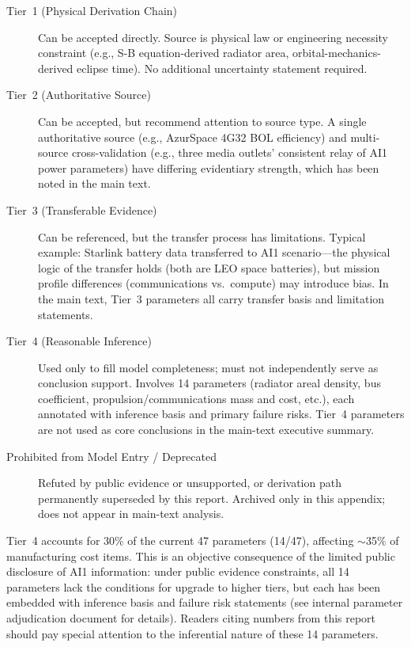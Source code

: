 \begin{description}
  \item[Tier~1 (Physical Derivation Chain)] Can be accepted directly. Source is physical law or engineering necessity constraint (e.g., S-B equation-derived radiator area, orbital-mechanics-derived eclipse time). No additional uncertainty statement required.

  \item[Tier~2 (Authoritative Source)] Can be accepted, but recommend attention to source type. A single authoritative source (e.g., AzurSpace 4G32 BOL efficiency) and multi-source cross-validation (e.g., three media outlets' consistent relay of AI1 power parameters) have differing evidentiary strength, which has been noted in the main text.

  \item[Tier~3 (Transferable Evidence)] Can be referenced, but the transfer process has limitations. Typical example: Starlink battery data transferred to AI1 scenario---the physical logic of the transfer holds (both are LEO space batteries), but mission profile differences (communications vs.\ compute) may introduce bias. In the main text, Tier~3 parameters all carry transfer basis and limitation statements.

  \item[Tier~4 (Reasonable Inference)] Used only to fill model completeness; must not independently serve as conclusion support. Involves 14 parameters (radiator areal density, bus coefficient, propulsion/communications mass and cost, etc.), each annotated with inference basis and primary failure risks. Tier~4 parameters are not used as core conclusions in the main-text executive summary.

  \item[Prohibited from Model Entry / Deprecated] Refuted by public evidence or unsupported, or derivation path permanently superseded by this report. Archived only in this appendix; does not appear in main-text analysis.
\end{description}

Tier~4 accounts for 30\% of the current 47 parameters (14/47), affecting $\sim$35\% of manufacturing cost items. This is an objective consequence of the limited public disclosure of AI1 information: under public evidence constraints, all 14 parameters lack the conditions for upgrade to higher tiers, but each has been embedded with inference basis and failure risk statements (see internal parameter adjudication document for details). Readers citing numbers from this report should pay special attention to the inferential nature of these 14 parameters.

